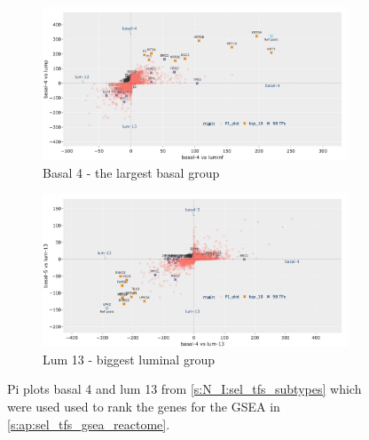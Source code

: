 \begin{figure}[H]
    \centering
    \begin{subfigure}[!t]{1.0\linewidth}
        \includegraphics[width=\textwidth,keepaspectratio]{Sections/Network_I/Resources/selective_pruning/pi_gsea/pi_largeBasal.png}
        \caption{Basal 4 - the largest basal group}
        \label{fig:ap:pi_basal}
    \end{subfigure}
    \begin{subfigure}[!t]{1.0\textwidth}
        \includegraphics[width=\textwidth,keepaspectratio]{Sections/Network_I/Resources/selective_pruning/pi_gsea/pi_largeLuminal.png}
        \caption{Lum 13 - biggest luminal group}
        \label{fig:ap:pi_lum}
    \end{subfigure}
    \caption{Pi plots basal 4 and lum 13 from \cref{s:N_I:sel_tfs_subtypes} which were used used to rank the genes for the GSEA in \cref{s:ap:sel_tfs_gsea_reactome}.}
    \label{fig:ap:pi_other_values_I}
\end{figure}

